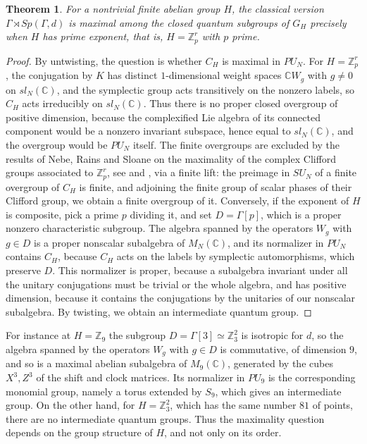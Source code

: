 \documentclass[11pt]{amsart}
\newtheorem{theorem}{Theorem}[section]
\theoremstyle{definition}
\begin{document}
\begin{theorem}
For a nontrivial finite abelian group $H$, the classical version $\Gamma\rtimes Sp(\Gamma,d)$ is maximal among the closed quantum subgroups of $G_H$ precisely when $H$ has prime exponent, that is, $H=\mathbb Z_p^r$ with $p$ prime.
\end{theorem}

\begin{proof}
By untwisting, the question is whether $C_H$ is maximal in $PU_N$. For $H=\mathbb Z_p^r$, the conjugation by $K$ has distinct $1$-dimensional weight spaces $\mathbb CW_g$ with $g\neq0$ on $sl_N(\mathbb C)$, and the symplectic group acts transitively on the nonzero labels, so $C_H$ acts irreducibly on $sl_N(\mathbb C)$. Thus there is no proper closed overgroup of positive dimension, because the complexified Lie algebra of its connected component would be a nonzero invariant subspace, hence equal to $sl_N(\mathbb C)$, and the overgroup would be $PU_N$ itself. The finite overgroups are excluded by the results of Nebe, Rains and Sloane on the maximality of the complex Clifford groups associated to $\mathbb Z_p^r$, see \cite[Theorems 6.5 and 7.3]{nrs} and \cite{nr2}, via a finite lift: the preimage in $SU_N$ of a finite overgroup of $C_H$ is finite, and adjoining the finite group of scalar phases of their Clifford group, we obtain a finite overgroup of it. Conversely, if the exponent of $H$ is composite, pick a prime $p$ dividing it, and set $D=\Gamma[p]$, which is a proper nonzero characteristic subgroup. The algebra spanned by the operators $W_g$ with $g\in D$ is a proper nonscalar subalgebra of $M_N(\mathbb C)$, and its normalizer in $PU_N$ contains $C_H$, because $C_H$ acts on the labels by symplectic automorphisms, which preserve $D$. This normalizer is proper, because a subalgebra invariant under all the unitary conjugations must be trivial or the whole algebra, and has positive dimension, because it contains the conjugations by the unitaries of our nonscalar subalgebra. By twisting, we obtain an intermediate quantum group.
\end{proof}

For instance at $H=\mathbb Z_9$ the subgroup $D=\Gamma[3]\simeq\mathbb Z_3^2$ is isotropic for $d$, so the algebra spanned by the operators $W_g$ with $g\in D$ is commutative, of dimension $9$, and so is a maximal abelian subalgebra of $M_9(\mathbb C)$, generated by the cubes $X^3,Z^3$ of the shift and clock matrices. Its normalizer in $PU_9$ is the corresponding monomial group, namely a torus extended by $S_9$, which gives an intermediate group. On the other hand, for $H=\mathbb Z_3^2$, which has the same number $81$ of points, there are no intermediate quantum groups. Thus the maximality question depends on the group structure of $H$, and not only on its order.
\end{document}
